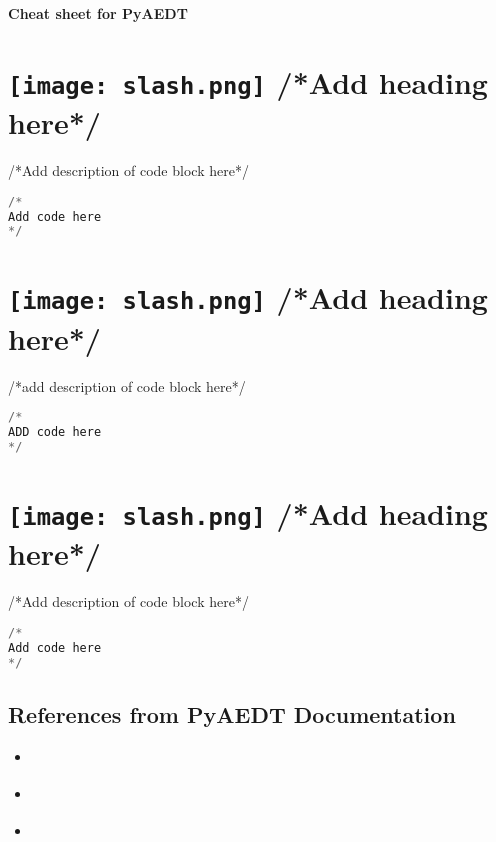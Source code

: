 \documentclass[9pt,landscape]{article}
\begin{document}
\raggedright
\footnotesize
\begin{center}
     \Huge{\textbf{Cheat sheet for PyAEDT}} \\
\end{center}
\vspace{-0.15cm}
\noindent\makebox[\linewidth]{\rule{\paperwidth}{2pt}}

\begin{multicols}{3}
\setlength{\premulticols}{1pt}
\setlength{\postmulticols}{1pt}
\setlength{\multicolsep}{1pt}
\setlength{\columnsep}{2pt}

\section{\texttt{[image: slash.png]} /*Add heading here*/}
/*Add description of code block here*/
\begin{lstlisting}[language=Python]
/*
Add code here
*/
\end{lstlisting}

\vfill
\section{\texttt{[image: slash.png]}  /*Add heading here*/}
/*add description of code block here*/
\begin{lstlisting}[language=Python]
/*
ADD code here
*/
\end{lstlisting} 
\vfill

\section{\texttt{[image: slash.png]}  /*Add heading here*/}
/*Add description of code block here*/
\begin{lstlisting}[language=Python]
/*
Add code here
*/
\end{lstlisting} 

\subsection{References from PyAEDT Documentation}
\begin{itemize}
\item \href{https://aedtdocs.pyansys.com/Resources/Installation.html}{\color{blue}{Installation}}
\item \href{https://aedtdocs.pyansys.com/Resources/Code_Guidelines.html}{\color{blue}{Code guidelines}}
\item \href{https://aedtdocs.pyansys.com/API/index.html}{\color{blue}{API reference}}
\end{itemize}
\end{multicols}
\end{document}
